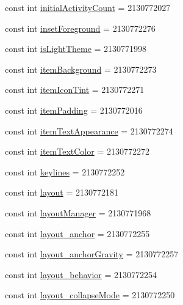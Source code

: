 \begin{CompactItemize}
\item 
const int \hyperlink{class__2doo_1_1_droid_1_1_resource_1_1_attribute_5974ba20533fa0be47c1cd6d9c844a54}{initialActivityCount} = 2130772027
\item 
const int \hyperlink{class__2doo_1_1_droid_1_1_resource_1_1_attribute_e260c5a877124db051e83f85db6beb5b}{insetForeground} = 2130772276
\item 
const int \hyperlink{class__2doo_1_1_droid_1_1_resource_1_1_attribute_c57bff3937b051181bbeddad74fe7339}{isLightTheme} = 2130771998
\item 
const int \hyperlink{class__2doo_1_1_droid_1_1_resource_1_1_attribute_2c33a694b656db7d7f643537b2e95e16}{itemBackground} = 2130772273
\item 
const int \hyperlink{class__2doo_1_1_droid_1_1_resource_1_1_attribute_b1f606e84f650d67c4467144353c172b}{itemIconTint} = 2130772271
\item 
const int \hyperlink{class__2doo_1_1_droid_1_1_resource_1_1_attribute_98392cd3635217a34414bd0750d98df7}{itemPadding} = 2130772016
\item 
const int \hyperlink{class__2doo_1_1_droid_1_1_resource_1_1_attribute_a5900b23c8475bdeb23b89de0e2c1bad}{itemTextAppearance} = 2130772274
\item 
const int \hyperlink{class__2doo_1_1_droid_1_1_resource_1_1_attribute_dcf77c0238221a0fbce30f8fb3aa0407}{itemTextColor} = 2130772272
\item 
const int \hyperlink{class__2doo_1_1_droid_1_1_resource_1_1_attribute_b40c23a9ac96ca394677273b4d99b6cb}{keylines} = 2130772252
\item 
const int \hyperlink{class__2doo_1_1_droid_1_1_resource_1_1_attribute_5a0bfc8b05e1a538670ceea8d8338081}{layout} = 2130772181
\item 
const int \hyperlink{class__2doo_1_1_droid_1_1_resource_1_1_attribute_624937b76fa47d73df2cefc4450630f3}{layoutManager} = 2130771968
\item 
const int \hyperlink{class__2doo_1_1_droid_1_1_resource_1_1_attribute_6fcb2a283d671b42d8fee2859e40d235}{layout\_\-anchor} = 2130772255
\item 
const int \hyperlink{class__2doo_1_1_droid_1_1_resource_1_1_attribute_d6832eae6d167033b8cdab867e83eecf}{layout\_\-anchorGravity} = 2130772257
\item 
const int \hyperlink{class__2doo_1_1_droid_1_1_resource_1_1_attribute_5ad50e1eedda7e6b632790cde37329b1}{layout\_\-behavior} = 2130772254
\item 
const int \hyperlink{class__2doo_1_1_droid_1_1_resource_1_1_attribute_3e59c92adc387cae2b59d86a1d90965d}{layout\_\-collapseMode} = 2130772250

\end{CompactItemize}
